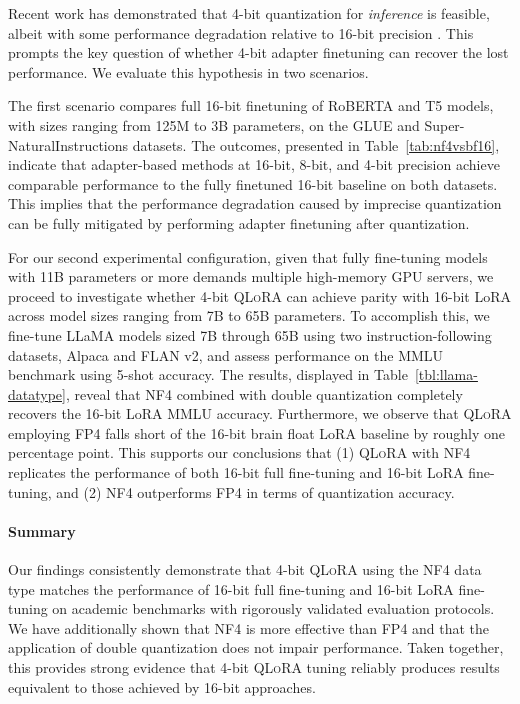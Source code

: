 Recent work has demonstrated that 4-bit quantization for \emph{inference} is feasible, albeit with some performance degradation relative to 16-bit precision \citep{dettmers2022case,frantar2022gptq}. This prompts the key question of whether 4-bit adapter finetuning can recover the lost performance. We evaluate this hypothesis in two scenarios. 

The first scenario compares full 16-bit finetuning of RoBERTA and T5 models, with sizes ranging from 125M to 3B parameters, on the GLUE and Super-NaturalInstructions datasets. The outcomes, presented in Table~\ref{tab:nf4vsbf16}, indicate that adapter-based methods at 16-bit, 8-bit, and 4-bit precision achieve comparable performance to the fully finetuned 16-bit baseline on both datasets. This implies that the performance degradation caused by imprecise quantization can be fully mitigated by performing adapter finetuning after quantization.

For our second experimental configuration, given that fully fine-tuning models with 11B parameters or more demands multiple high-memory GPU servers, we proceed to investigate whether 4-bit \textsc{QLoRA} can achieve parity with 16-bit LoRA across model sizes ranging from 7B to 65B parameters. To accomplish this, we fine-tune LLaMA models sized 7B through 65B using two instruction-following datasets, Alpaca and FLAN v2, and assess performance on the MMLU benchmark using 5-shot accuracy. The results, displayed in Table~\ref{tbl:llama-datatype}, reveal that NF4 combined with double quantization completely recovers the 16-bit LoRA MMLU accuracy. Furthermore, we observe that \textsc{QLoRA} employing FP4 falls short of the 16-bit brain float LoRA baseline by roughly one percentage point. This supports our conclusions that (1) \textsc{QLoRA} with NF4 replicates the performance of both 16-bit full fine-tuning and 16-bit LoRA fine-tuning, and (2) NF4 outperforms FP4 in terms of quantization accuracy.

\paragraph{Summary} Our findings consistently demonstrate that 4-bit \textsc{QLoRA} using the NF4 data type matches the performance of 16-bit full fine-tuning and 16-bit LoRA fine-tuning on academic benchmarks with rigorously validated evaluation protocols. We have additionally shown that NF4 is more effective than FP4 and that the application of double quantization does not impair performance. Taken together, this provides strong evidence that 4-bit \textsc{QLoRA} tuning reliably produces results equivalent to those achieved by 16-bit approaches.

